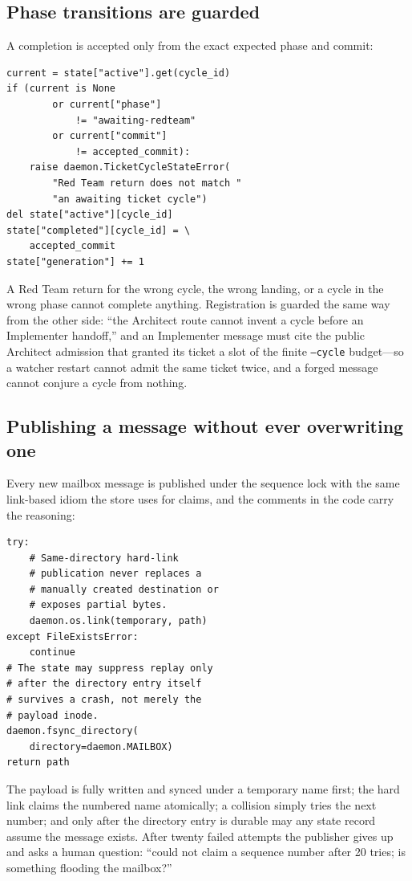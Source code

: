 \documentclass[10pt,aps,prd,twocolumn,nofootinbib]{revtex4-2}
\newcommand{\code}[1]{\texttt{#1}}
\begin{document}
\subsection{Phase transitions are guarded}

A completion is accepted only from the exact expected phase and
commit:

\begin{verbatim}
current = state["active"].get(cycle_id)
if (current is None
        or current["phase"]
            != "awaiting-redteam"
        or current["commit"]
            != accepted_commit):
    raise daemon.TicketCycleStateError(
        "Red Team return does not match "
        "an awaiting ticket cycle")
del state["active"][cycle_id]
state["completed"][cycle_id] = \
    accepted_commit
state["generation"] += 1
\end{verbatim}

A Red Team return for the wrong cycle, the wrong landing, or a cycle
in the wrong phase cannot complete anything.  Registration is guarded
the same way from the other side: ``the Architect route cannot invent
a cycle before an Implementer handoff,'' and an Implementer message
must cite the public Architect admission that granted its ticket a
slot of the finite \code{--cycle} budget---so a watcher restart cannot
admit the same ticket twice, and a forged message cannot conjure a
cycle from nothing.

\subsection{Publishing a message without ever overwriting one}

Every new mailbox message is published under the sequence lock with
the same link-based idiom the store uses for claims, and the comments
in the code carry the reasoning:

\begin{verbatim}
try:
    # Same-directory hard-link
    # publication never replaces a
    # manually created destination or
    # exposes partial bytes.
    daemon.os.link(temporary, path)
except FileExistsError:
    continue
# The state may suppress replay only
# after the directory entry itself
# survives a crash, not merely the
# payload inode.
daemon.fsync_directory(
    directory=daemon.MAILBOX)
return path
\end{verbatim}

The payload is fully written and synced under a temporary name first;
the hard link claims the numbered name atomically; a collision simply
tries the next number; and only after the directory entry is durable
may any state record assume the message exists.  After twenty failed
attempts the publisher gives up and asks a human question: ``could not
claim a sequence number after 20 tries; is something flooding the
mailbox?''
\end{document}
